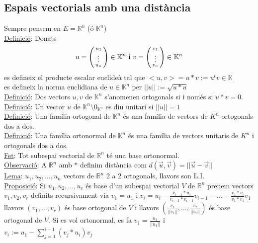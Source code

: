 \subsection{Espais vectorials amb una distància}
Sempre pensem en $E = \mathbb{R}^n$ (ó $\mathbb{K}^n$)\\
\underline{Definició}: Donats 
\begin{displaymath}
    u=\begin{psmallmatrix} u_1 \\ \vdots \\ u_n \end{psmallmatrix} \in \mathbb{K}^n \text{ i }v=\begin{psmallmatrix} v_1 \\ \vdots \\ v_n \end{psmallmatrix} \in \mathbb{K}^n
\end{displaymath}
es defineix el producte escalar euclideà tal que $<u, v> = u * v := u^tv \in \mathbb{K}$\\
es defineix la norma euclidiana de $u \in \mathbb{K}^n$ per $||u|| := \sqrt{u*u}$\\
\underline{Definició}: Dos vectors $u, v$ de $\mathbb{K}^n$ s'anomenen ortogonals si i només si $u*v=0$.\\
\underline{Definició}: Un vector $u$ de $\mathbb{K}^n \setminus 0_{\mathbb{K}^n}$ es diu unitari si $||u|| = 1$\\
\underline{Definició}: Una família ortogonal de $\mathbb{K}^n$ és una família de vectors de $K^n$ ortogonals dos a dos.\\
\underline{Definició}: Una família ortonormal de $\mathbb{K}^n$ és una família de vectors unitaris de $K^n$ i ortogonals dos a dos.\\
\underline{Fet}: Tot subespai vectorial de $\mathbb{R}^n$ té una base ortonormal.\\
\underline{Observació}: A $\mathbb{R}^n$ amb $*$ definim distància com $d(\vec{u}, \vec{v}) = ||\vec{u}-\vec{v}||$\\
\underline{Lema}: $u_1, u_2, \dots, u_n$ vectors de $\mathbb{R}^n$ 2 a 2 ortogonals, llavors son L.I.\\
\underline{Proposició}: Si $u_1, u_2, \dots, u_r$ és base d'un subespai vectorial $V$ de $\mathbb{R}^n$ prenem vectors $v_1, v_2, v_r$ definits recursivament via $v_1 = u_1$ i $v_i = u_i - \frac{v_{i-1}*u_i}{v_{i-1}*v_{i-1}}v_{i-1} - \dots - \frac{v_1*v_i}{v_1*v_1}v_1$ llavors $(v_1, \dots, v_r)$ és base ortogonal de $V$ i llavors $(\frac{v_1}{||v_1||}, \dots, \frac{v_r}{||v_r||})$ és base ortogonal de $V$. Si es vol ortonormal, es fa $v_1 = \frac{u_1}{||u_1||}$ i $v_i := u_1 - \sum\limits_{j=1}^{i-1}(v_j*u_i)v_j$
